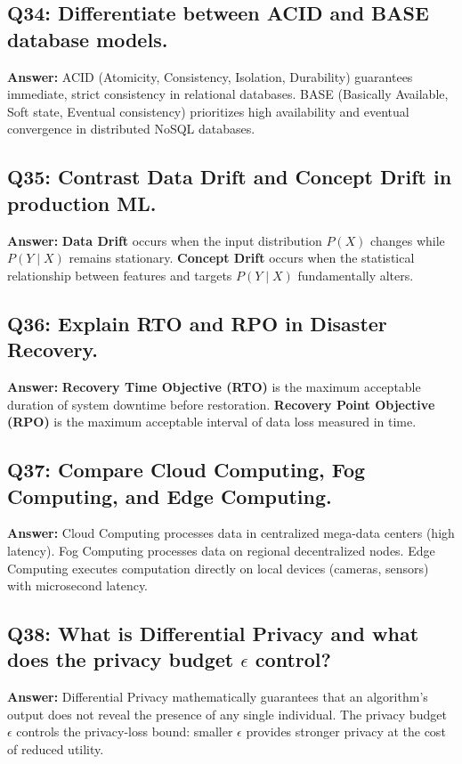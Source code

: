 \subsection*{Q34: Differentiate between ACID and BASE database models.}
\textbf{Answer:} ACID (Atomicity, Consistency, Isolation, Durability) guarantees immediate, strict consistency in relational databases. BASE (Basically Available, Soft state, Eventual consistency) prioritizes high availability and eventual convergence in distributed NoSQL databases.

\subsection*{Q35: Contrast Data Drift and Concept Drift in production ML.}
\textbf{Answer:} \textbf{Data Drift} occurs when the input distribution $P(X)$ changes while $P(Y \mid X)$ remains stationary. \textbf{Concept Drift} occurs when the statistical relationship between features and targets $P(Y \mid X)$ fundamentally alters.

\subsection*{Q36: Explain RTO and RPO in Disaster Recovery.}
\textbf{Answer:} \textbf{Recovery Time Objective (RTO)} is the maximum acceptable duration of system downtime before restoration. \textbf{Recovery Point Objective (RPO)} is the maximum acceptable interval of data loss measured in time.

\subsection*{Q37: Compare Cloud Computing, Fog Computing, and Edge Computing.}
\textbf{Answer:} Cloud Computing processes data in centralized mega-data centers (high latency). Fog Computing processes data on regional decentralized nodes. Edge Computing executes computation directly on local devices (cameras, sensors) with microsecond latency.

\subsection*{Q38: What is Differential Privacy and what does the privacy budget $\epsilon$ control?}
\textbf{Answer:} Differential Privacy mathematically guarantees that an algorithm's output does not reveal the presence of any single individual. The privacy budget $\epsilon$ controls the privacy-loss bound: smaller $\epsilon$ provides stronger privacy at the cost of reduced utility.

